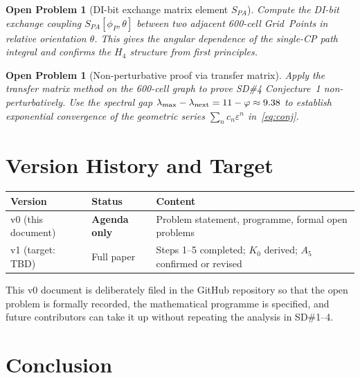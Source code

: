 \documentclass[11pt,letterpaper]{article}
\newtheorem{openprob}[theorem]{Open Problem}
\newcommand{\phig}{\varphi}
\newcommand{\eps}{\varepsilon}
\begin{document}
\begin{openprob}[DI-bit exchange matrix element $S_{PA}$]
\label{op:SPA}
Compute the DI-bit exchange coupling $S_{PA}[\phi_P,\theta]$
between two adjacent 600-cell Grid~Points in relative orientation
$\theta$.  This gives the angular dependence of the single-CP
path integral and confirms the $H_4$ structure from first
principles.
\end{openprob}

\begin{openprob}[Non-perturbative proof via transfer matrix]
\label{op:nonpert}
Apply the transfer matrix method on the 600-cell graph to prove
SD\#4 Conjecture~1 non-perturbatively.  Use the spectral gap
$\lambda_{\rm max} - \lambda_{\rm next} = 11 - \phig \approx 9.38$
to establish exponential convergence of the geometric series
$\sum_n c_n \eps^n$ in~\eqref{eq:conj}.
\end{openprob}

\section{Version History and Target}

\begin{center}
\begin{tabular}{@{}lll@{}}
\toprule
Version & Status & Content \\
\midrule
v0 (this document) & \textbf{Agenda only} & Problem statement,
  programme, formal open problems \\
v1 (target: TBD) & Full paper & Steps 1--5 completed;
  $K_0$ derived; $A_5$ confirmed or revised \\
\bottomrule
\end{tabular}
\end{center}

This v0 document is deliberately filed in the GitHub repository
so that the open problem is formally recorded, the mathematical
programme is specified, and future contributors can take it up
without repeating the analysis in SD\#1--4.

\section{Conclusion}
\end{document}
